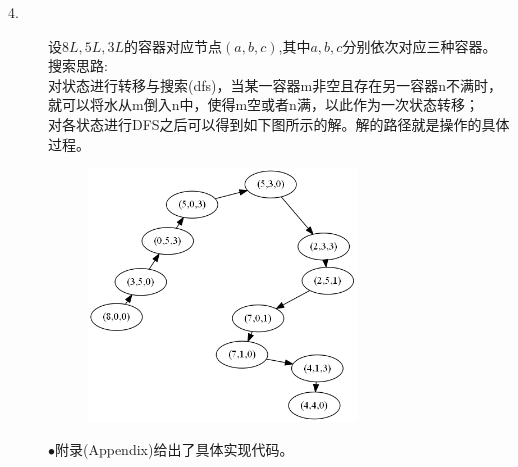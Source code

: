 \documentclass[UTF8, onecolumn, a4paper]{article}
\begin{document}
\begin{description}
\item[4.]
设$8L,5L,3L$的容器对应节点$(a,b,c)$,其中$a,b,c$分别依次对应三种容器。\\
搜索思路:\\
对状态进行转移与搜索(dfs)，当某一容器m非空且存在另一容器n不满时，就可以将水从m倒入n中，使得m空或者n满，以此作为一次状态转移；\\
对各状态进行DFS之后可以得到如下图所示的解。解的路径就是操作的具体过程。\\
\begin{figure}[h]
	\centering
	\includegraphics[width=0.70\textwidth]{demo.png}
\end{figure}
$\bullet$附录(Appendix)给出了具体实现代码。


\end{description}
\end{document}
